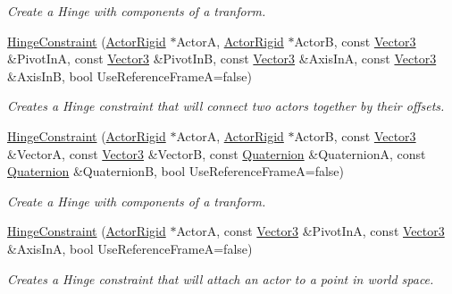 \begin{DoxyCompactItemize}
\begin{DoxyCompactList}\small\item\em Create a Hinge with components of a tranform. \item\end{DoxyCompactList}\item 
\hyperlink{classphys_1_1HingeConstraint_aa4e74519af2c4773de038fb1ae2776eb}{HingeConstraint} (\hyperlink{classphys_1_1ActorRigid}{ActorRigid} $\ast$ActorA, \hyperlink{classphys_1_1ActorRigid}{ActorRigid} $\ast$ActorB, const \hyperlink{classphys_1_1Vector3}{Vector3} \&PivotInA, const \hyperlink{classphys_1_1Vector3}{Vector3} \&PivotInB, const \hyperlink{classphys_1_1Vector3}{Vector3} \&AxisInA, const \hyperlink{classphys_1_1Vector3}{Vector3} \&AxisInB, bool UseReferenceFrameA=false)
\begin{DoxyCompactList}\small\item\em Creates a Hinge constraint that will connect two actors together by their offsets. \item\end{DoxyCompactList}\item 
\hyperlink{classphys_1_1HingeConstraint_af21f5ee3889f1bd9e70063c04db32af0}{HingeConstraint} (\hyperlink{classphys_1_1ActorRigid}{ActorRigid} $\ast$ActorA, \hyperlink{classphys_1_1ActorRigid}{ActorRigid} $\ast$ActorB, const \hyperlink{classphys_1_1Vector3}{Vector3} \&VectorA, const \hyperlink{classphys_1_1Vector3}{Vector3} \&VectorB, const \hyperlink{classphys_1_1Quaternion}{Quaternion} \&QuaternionA, const \hyperlink{classphys_1_1Quaternion}{Quaternion} \&QuaternionB, bool UseReferenceFrameA=false)
\begin{DoxyCompactList}\small\item\em Create a Hinge with components of a tranform. \item\end{DoxyCompactList}\item 
\hyperlink{classphys_1_1HingeConstraint_ab112696e53f61f57f4ca53b299e9ef87}{HingeConstraint} (\hyperlink{classphys_1_1ActorRigid}{ActorRigid} $\ast$ActorA, const \hyperlink{classphys_1_1Vector3}{Vector3} \&PivotInA, const \hyperlink{classphys_1_1Vector3}{Vector3} \&AxisInA, bool UseReferenceFrameA=false)
\begin{DoxyCompactList}\small\item\em Creates a Hinge constraint that will attach an actor to a point in world space. \item\end{DoxyCompactList}\item 

\end{DoxyCompactItemize}
